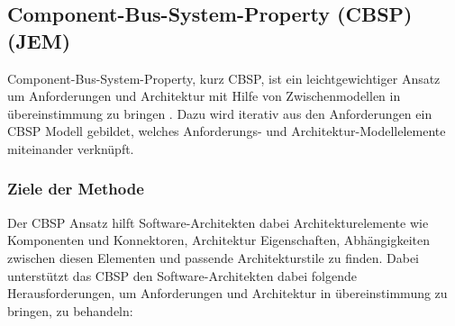 \subsection{Component-Bus-System-Property (CBSP) (JEM)}\label{cbsp}
Component-Bus-System-Property, kurz CBSP, ist ein leichtgewichtiger Ansatz um Anforderungen und Architektur mit Hilfe von Zwischenmodellen in \"ubereinstimmung zu bringen \cite{Gru01}. Dazu wird iterativ aus den Anforderungen ein CBSP Modell gebildet, welches Anforderungs- und Architektur-Modellelemente miteinander verkn\"upft. \\

\subsubsection{Ziele der Methode}

Der CBSP Ansatz hilft Software-Architekten dabei Architekturelemente wie Komponenten und Konnektoren, Architektur Eigenschaften, Abh\"angigkeiten zwischen diesen Elementen und passende Architekturstile zu finden. Dabei unterst\"utzt das CBSP den Software-Architekten dabei folgende Herausforderungen, um Anforderungen und Architektur in \"ubereinstimmung zu bringen, zu behandeln: \\

